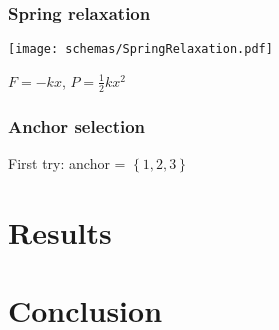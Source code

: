 \documentclass{beamer}
\begin{document}
\begin{frame}
    \frametitle{Spring relaxation}
    \begin{center}
    \texttt{[image: schemas/SpringRelaxation.pdf]}
    \end{center}
    
    $F=-kx$, $P = \frac{1}{2} k x^2$
\end{frame}

\begin{frame}
    \frametitle{Anchor selection}
    
    First try: anchor = $\left\{ 1,2,3 \right\}$
    
\end{frame}

\section{Results}
\section{Conclusion}
\end{document}
